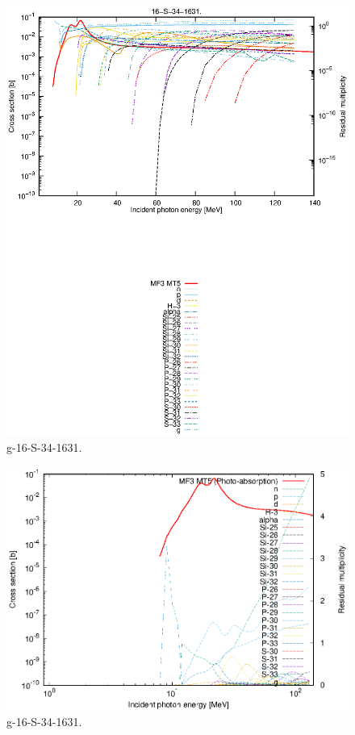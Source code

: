 \begin{figure}
 \includegraphics[width=\linewidth]{eps/g_16-S-34_1631.eps}
  \caption{g-16-S-34-1631.}
\end{figure}
\newpage \clearpage

\begin{figure}
 \includegraphics[width=\linewidth]{eps-log/g_16-S-34_1631.eps}
 \caption{g-16-S-34-1631.}
\end{figure}
\newpage \clearpage

